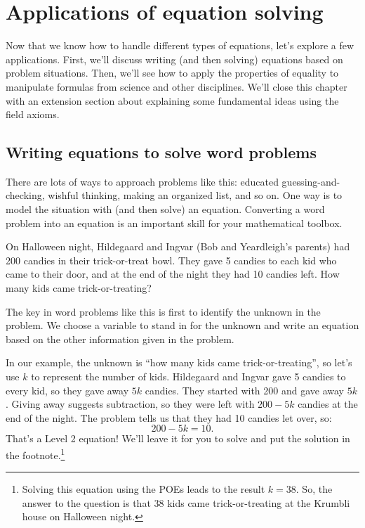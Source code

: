 \section{Applications of equation solving}
\label{sec:eqsolveapplications}

Now that we know how to handle different types of equations, let's explore a few applications. First, we'll discuss writing (and then solving) equations based on problem situations. Then, we'll see how to apply the properties of equality to manipulate formulas from science and other disciplines. We'll close this chapter with an extension section about explaining some fundamental ideas using the field axioms.

\subsection{Writing equations to solve word problems}

There are lots of ways to approach problems like this: educated guessing-and-checking, wishful thinking, making an organized list, and so on. One way is to model the situation with (and then solve) an equation. Converting a word problem into an equation is an important skill for your mathematical toolbox.


\begin{boxexplore}
On Halloween night, Hildegaard and Ingvar (Bob and Yeardleigh's parents) had 200 candies in their trick-or-treat bowl. They gave 5 candies to each kid who came to their door, and at the end of the night they had 10 candies left. How many kids came trick-or-treating?
\end{boxexplore}

The key in word problems like this is first to identify the unknown in the problem. We choose a variable to stand in for the unknown and write an equation based on the other information given in the problem.

In our example, the unknown is ``how many kids came trick-or-treating'', so let's use $k$ to represent the number of kids. Hildegaard and Ingvar gave 5 candies to every kid, so they gave away $5k$ candies. They started with 200 and gave away $5k$. Giving away suggests subtraction, so they were left with $200-5k$ candies at the end of the night. The problem tells us that they had 10 candies let over, so:
\[200-5k = 10.\]
That's a Level 2 equation! We'll leave it for you to solve and put the solution in the footnote.\footnote{Solving this equation using the POEs leads to the result $k=38$. So, the answer to the question is that 38 kids came trick-or-treating at the Krumbli house on Halloween night.}

